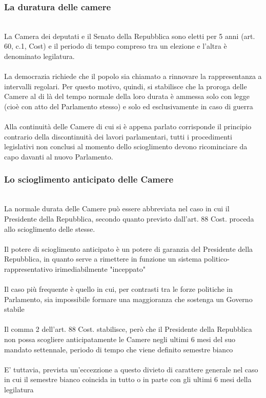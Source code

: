 \documentclass{report}
\begin{document}
\subsubsection{La duratura delle camere}
\\
La Camera dei deputati e il Senato della Repubblica sono eletti per 5 anni (art. 60, c.1, Cost) e il periodo di tempo compreso tra un elezione e l'altra è denominato legilatura.
\\
\\
La democrazia richiede che il popolo sia chiamato a rinnovare la rappresentanza a intervalli regolari. Per questo motivo, quindi, si stabilisce che la proroga delle Camere al di là del tempo normale della loro durata è ammessa solo con legge (cioè con atto del Parlamento stesso) e solo ed esclusivamente in caso di guerra
\\
\\
Alla continuità delle Camere di cui si è appena parlato corrisponde il principio contrario della discontinuità dei lavori parlamentari, tutti i procedimenti legislativi non conclusi al momento dello scioglimento devono ricominciare da capo davanti al nuovo Parlamento.
\\
\subsubsection{Lo scioglimento anticipato delle Camere}
\\
La normale durata delle Camere può essere abbreviata nel caso in cui il Presidente della Repubblica, secondo quanto previsto dall'art. 88 Cost. proceda allo scioglimento delle stesse.
\\
\\
Il potere di scioglimento anticipato è un potere di garanzia del Presidente della Repubblica, in quanto serve a rimettere in funzione un sistema politico-rappresentativo irimediabilmente "inceppato"
\\
\\
Il caso più frequente è quello in cui, per contrasti tra le forze politiche in Parlamento, sia impossibile formare una maggioranza che sostenga un Governo stabile
\\
\\
Il comma 2 dell'art. 88 Cost. stabilisce, però che il Presidente della Repubblica non possa scogliere anticipatamente le Camere negli ultimi 6 mesi del suo mandato settennale, periodo di tempo che viene definito semestre bianco
\\
\\
E' tuttavia, prevista un'eccezzione a questo divieto di carattere generale nel caso in cui il semestre bianco coincida in tutto o in parte con gli ultimi 6 mesi della legilatura
\\
\end{document}

